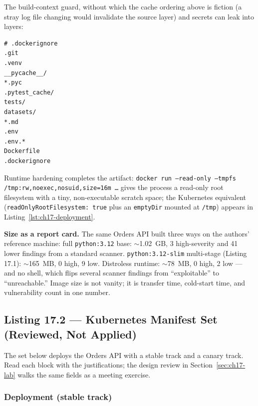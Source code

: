 The build-context guard, without which the cache ordering above is
fiction (a stray log file changing would invalidate the source layer) and
secrets can leak into layers:

\begin{verbatim}
# .dockerignore
.git
.venv
__pycache__/
*.pyc
.pytest_cache/
tests/
datasets/
*.md
.env
.env.*
Dockerfile
.dockerignore
\end{verbatim}

Runtime hardening completes the artifact: \texttt{docker run --read-only
--tmpfs /tmp:rw,noexec,nosuid,size=16m \ldots} gives the process a
read-only root filesystem with a tiny, non-executable scratch space; the
Kubernetes equivalent (\texttt{readOnlyRootFilesystem: true} plus an
\texttt{emptyDir} mounted at \texttt{/tmp}) appears in
Listing~\ref{lst:ch17-deployment}.

\begin{examplebox}
\textbf{Size as a report card.} The same Orders API built three ways on
the authors' reference machine: full \texttt{python:3.12} base:
$\sim$1.02~GB, 3 high-severity and 41 lower findings from a standard
scanner. \texttt{python:3.12-slim} multi-stage (Listing 17.1):
$\sim$165~MB, 0 high, 9 low. Distroless runtime: $\sim$78~MB, 0 high,
2 low --- and no shell, which flips several scanner findings from
``exploitable'' to ``unreachable.'' Image size is not vanity; it is
transfer time, cold-start time, and vulnerability count in one number.
\end{examplebox}

\subsection{Listing 17.2 --- Kubernetes Manifest Set (Reviewed, Not Applied)}
\label{sec:ch17-manifests}

The set below deploys the Orders API with a stable track and a canary
track. Read each block with the justifications; the design review in
Section~\ref{sec:ch17-lab} walks the same fields as a meeting exercise.

\subsubsection*{Deployment (stable track)}
\label{lst:ch17-deployment}


